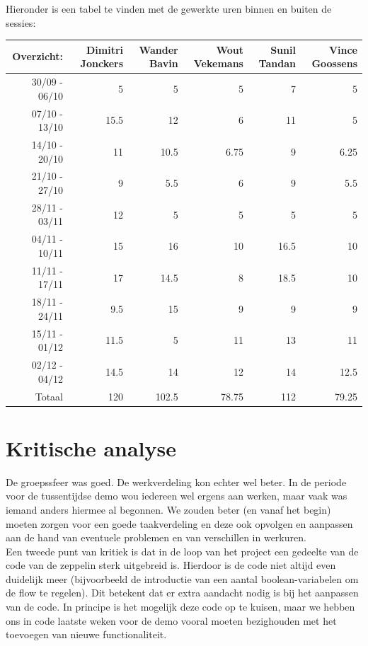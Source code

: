 \documentclass[eind]{penoverslag}
\begin{document}
Hieronder is een tabel te vinden met de gewerkte uren binnen en buiten de sessies: \\

\begin{tabular}{r||r|r|r|r|r}
Overzicht: & Dimitri Jonckers & Wander Bavin & Wout Vekemans & Sunil Tandan & Vince Goossens \\
\hline \hline 
30/09 - 06/10 & 5 & 5 & 5 & 7 & 5 \\
07/10 - 13/10 & 15.5 & 12 & 6 & 11 & 5 \\
14/10 - 20/10 & 11 & 10.5 & 6.75 & 9 & 6.25 \\
21/10 - 27/10 & 9 & 5.5 & 6 & 9 & 5.5 \\
28/11 - 03/11 & 12 & 5 & 5 & 5 & 5 \\
04/11 - 10/11 & 15 & 16 & 10 & 16.5 & 10 \\
11/11 - 17/11 & 17 & 14.5 & 8 & 18.5 & 10 \\
18/11 - 24/11 & 9.5 & 15 & 9 & 9 & 9 \\
15/11 - 01/12 & 11.5 & 5 & 11 & 13 & 11 \\
02/12 - 04/12 & 14.5 & 14 & 12 & 14 & 12.5 \\
\hline \hline
Totaal & 120 & 102.5 & 78.75 & 112 & 79.25 \\
\end{tabular}

\section{Kritische analyse}
De groepssfeer was goed. De werkverdeling kon echter wel beter. In de periode voor de tussentijdse demo wou iedereen wel ergens aan werken, maar vaak was iemand anders hiermee al begonnen. We zouden beter (en vanaf het begin) moeten zorgen voor een goede taakverdeling en deze ook opvolgen en aanpassen aan de hand van eventuele problemen en van verschillen in werkuren. \\

Een tweede punt van kritiek is dat in de loop van het project een gedeelte van de code van de zeppelin sterk uitgebreid is. Hierdoor is de code niet altijd even duidelijk meer (bijvoorbeeld de introductie van een aantal boolean-variabelen om de flow te regelen). Dit betekent dat er extra aandacht nodig is bij het aanpassen van de code. In principe is het mogelijk deze code op te kuisen, maar we hebben ons in code laatste weken voor de demo vooral moeten bezighouden met het toevoegen van nieuwe functionaliteit. \\
\end{document}
